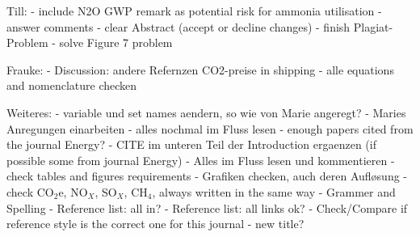 

Till:
- include N2O GWP remark as potential risk for ammonia utilisation
- answer comments
- clear Abstract (accept or decline changes)
- finish Plagiat-Problem
- solve Figure 7 problem

Frauke:
- Discussion: andere Refernzen CO2-preise in shipping
- alle equations and nomenclature checken

Weiteres:
- variable und set names aendern, so wie von Marie angeregt?
- Maries Anregungen einarbeiten
- alles nochmal im Fluss lesen
- enough papers cited from the journal Energy?
- CITE im unteren Teil der Introduction ergaenzen (if possible some from journal Energy)
- Alles im Fluss lesen und kommentieren
- check tables and figures requirements
- Grafiken checken, auch deren Aufløsung
- check CO$_2$e, NO$_X$, SO$_X$, CH$_4$, always written in the same way
- Grammer and Spelling
- Reference list: all in?
- Reference list: all links ok?
- Check/Compare if reference style is the correct one for this journal
- new title?